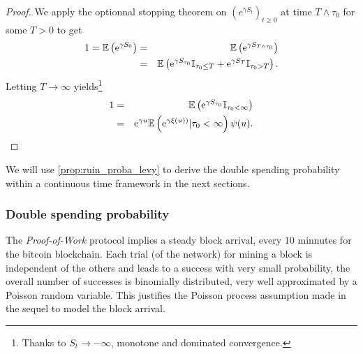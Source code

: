 \begin{proof}
We apply the optionnal stopping theorem on $(e^{\gamma S_t})_{t\geq0}$ at time $T\land \tau_0$ for some $T>0$ to get 
\begin{eqnarray*}
1 = \mathbb{E}\left(\mathrm{e}^{\gamma S_0}\right)&=& \mathbb{E}\left(\mathrm{e}^{\gamma S_{T\land \tau_0}}\right)\\  
&=& \mathbb{E}\left(\mathrm{e}^{\gamma S_{\tau_0}}\mathbb{I}_{\tau_0\leq T} + \mathrm{e}^{\gamma S_{T}}\mathbb{I}_{\tau_0> T}\right).\\
\end{eqnarray*} 
Letting $T\rightarrow\infty$ yields\footnote{Thanks to $S_t\rightarrow -\infty$, monotone and dominated convergence.}
\begin{eqnarray*}
1 &=&\mathbb{E}\left(\mathrm{e}^{\gamma S_{\tau_0}}\mathbb{I}_{\tau_0<\infty}\right)\\
&=&\mathrm{e}^{\gamma u}\mathbb{E}\left(\mathrm{e}^{\gamma \xi(u))}|\tau_0<\infty\right)\psi(u).
\end{eqnarray*} 
\end{proof}
We will use \cref{prop:ruin_proba_levy} to derive the double spending probability within a continuous time framework in the next sections.
\subsubsection{Double spending probability}\label{sssec:double_spending_counting_process_dsp}
The \textit{Proof-of-Work} protocol implies a steady block arrival, every $10$ minnutes for the bitcoin blockchain. Each trial (of the network) for mining a block is independent of the others and leads to a success with very small probability, the overall number of successes is binomially distributed, very well approximated by a
Poisson random variable. This justifies the Poisson process assumption made in the sequel to model the block arrival.\\

